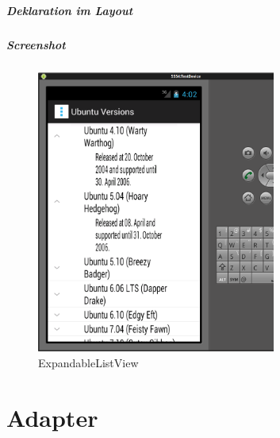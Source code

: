\begin{frame}
   \frametitle{Deklaration im Layout}
   
\end{frame}

\begin{frame}
   \frametitle{Screenshot}
   \begin{figure}[h!]
     \centering
     \includegraphics[width=0.7\textwidth]{pictures/explistview.ps}
     \caption{
        ExpandableListView
     }
     \label{fig:explistview}
   \end{figure}
\end{frame}

\part{Adapter}
\frame{\partpage}

